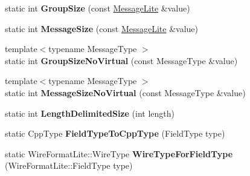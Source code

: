 \begin{DoxyCompactItemize}
static int {\bfseries Group\+Size} (const \hyperlink{classgoogle_1_1protobuf_1_1MessageLite}{Message\+Lite} \&value)
\item 
\mbox{\label{classgoogle_1_1protobuf_1_1internal_1_1WireFormatLite_aba94a07ed94924cbc8aedf000824dece}} 
static int {\bfseries Message\+Size} (const \hyperlink{classgoogle_1_1protobuf_1_1MessageLite}{Message\+Lite} \&value)
\item 
\mbox{\label{classgoogle_1_1protobuf_1_1internal_1_1WireFormatLite_a9f05ab0c496ec9d62026fcd9a580a7b5}} 
{\footnotesize template$<$typename Message\+Type $>$ }\\static int {\bfseries Group\+Size\+No\+Virtual} (const Message\+Type \&value)
\item 
\mbox{\label{classgoogle_1_1protobuf_1_1internal_1_1WireFormatLite_a4d08cbfffd3a10411a2bb7a28c5d70eb}} 
{\footnotesize template$<$typename Message\+Type $>$ }\\static int {\bfseries Message\+Size\+No\+Virtual} (const Message\+Type \&value)
\item 
\mbox{\label{classgoogle_1_1protobuf_1_1internal_1_1WireFormatLite_ae8a5d0fd7455b5390358f920032342e1}} 
static int {\bfseries Length\+Delimited\+Size} (int length)
\item 
\mbox{\label{classgoogle_1_1protobuf_1_1internal_1_1WireFormatLite_a4b3a5a47c84432d524ed7c5461ebe267}} 
static Cpp\+Type {\bfseries Field\+Type\+To\+Cpp\+Type} (Field\+Type type)
\item 
\mbox{\label{classgoogle_1_1protobuf_1_1internal_1_1WireFormatLite_aa271771fab1bff6db2b396c99c7e8978}} 
static Wire\+Format\+Lite\+::\+Wire\+Type {\bfseries Wire\+Type\+For\+Field\+Type} (Wire\+Format\+Lite\+::\+Field\+Type type)
\item 
\mbox{\label{classgoogle_1_1protobuf_1_1internal_1_1WireFormatLite_a6960784ac11d03041156ed4ee94d9678}} 

\end{DoxyCompactItemize}
